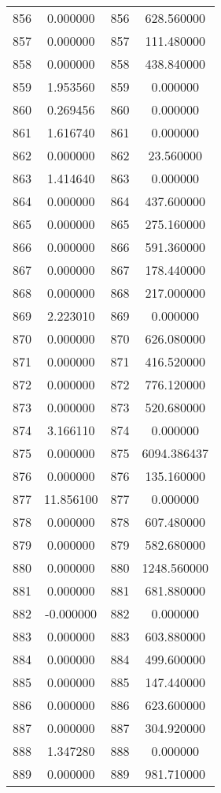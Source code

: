 \documentclass[12pt]{article}
\begin{document}
\begin{longtable}{@{}cccc@{}}
856 & 0.000000 & 856 & 628.560000 \\
857 & 0.000000 & 857 & 111.480000 \\
858 & 0.000000 & 858 & 438.840000 \\
859 & 1.953560 & 859 & 0.000000 \\
860 & 0.269456 & 860 & 0.000000 \\
861 & 1.616740 & 861 & 0.000000 \\
862 & 0.000000 & 862 & 23.560000 \\
863 & 1.414640 & 863 & 0.000000 \\
864 & 0.000000 & 864 & 437.600000 \\
865 & 0.000000 & 865 & 275.160000 \\
866 & 0.000000 & 866 & 591.360000 \\
867 & 0.000000 & 867 & 178.440000 \\
868 & 0.000000 & 868 & 217.000000 \\
869 & 2.223010 & 869 & 0.000000 \\
870 & 0.000000 & 870 & 626.080000 \\
871 & 0.000000 & 871 & 416.520000 \\
872 & 0.000000 & 872 & 776.120000 \\
873 & 0.000000 & 873 & 520.680000 \\
874 & 3.166110 & 874 & 0.000000 \\
875 & 0.000000 & 875 & 6094.386437 \\
876 & 0.000000 & 876 & 135.160000 \\
877 & 11.856100 & 877 & 0.000000 \\
878 & 0.000000 & 878 & 607.480000 \\
879 & 0.000000 & 879 & 582.680000 \\
880 & 0.000000 & 880 & 1248.560000 \\
881 & 0.000000 & 881 & 681.880000 \\
882 & -0.000000 & 882 & 0.000000 \\
883 & 0.000000 & 883 & 603.880000 \\
884 & 0.000000 & 884 & 499.600000 \\
885 & 0.000000 & 885 & 147.440000 \\
886 & 0.000000 & 886 & 623.600000 \\
887 & 0.000000 & 887 & 304.920000 \\
888 & 1.347280 & 888 & 0.000000 \\
889 & 0.000000 & 889 & 981.710000 \\

\end{longtable}
\end{document}
